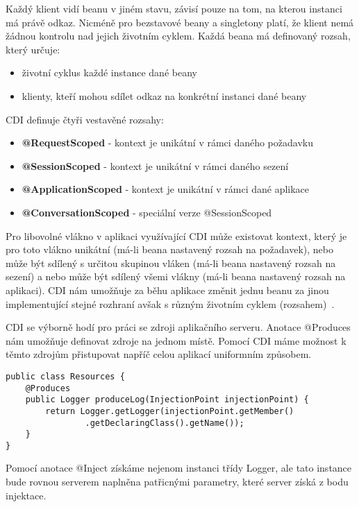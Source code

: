 \documentclass[122pt,oneside]{fithesis}
\begin{document}
Každý klient vidí beanu v jiném stavu, závisí pouze na tom, na kterou instanci má právě odkaz. Nicméně pro bezstavové beany a singletony platí, že klient nemá žádnou kontrolu nad jejich životním cyklem. Každá beana má definovaný rozsah, který určuje:

\begin{itemize}
  \item životní cyklus každé instance dané beany 
  \item klienty, kteří mohou sdílet odkaz na konkrétní instanci dané beany
\end{itemize}

CDI definuje čtyři vestavěné rozsahy:

\begin{itemize}
  \item{\bf @RequestScoped} - kontext je unikátní v rámci daného požadavku
  \item{\bf @SessionScoped} - kontext je unikátní v rámci daného sezení
  \item{\bf @ApplicationScoped} - kontext je unikátní v rámci dané aplikace
  \item{\bf @ConversationScoped} - speciální verze @SessionScoped
\end{itemize}

Pro libovolné vlákno v aplikaci využívající CDI může existovat kontext, který je pro toto vlákno unikátní (má-li beana nastavený rozsah na požadavek), nebo může být sdílený s určitou skupinou vláken (má-li beana nastavený rozsah na sezení) a nebo může být sdílený všemi vlákny (má-li beana nastavený rozsah na aplikaci). CDI nám umožňuje za běhu aplikace změnit jednu beanu za jinou implementující stejné rozhraní avšak s různým životním cyklem (rozsahem)~\cite{weld}.

CDI se výborně hodí pro práci se zdroji aplikačního serveru. Anotace @Produces nám umožňuje definovat zdroje na jednom místě. Pomocí CDI máme možnost k těmto zdrojům přistupovat napříč celou aplikací uniformním způsobem.

\begin{lstlisting}
public class Resources {
	@Produces
	public Logger produceLog(InjectionPoint injectionPoint) {
		return Logger.getLogger(injectionPoint.getMember()
				.getDeclaringClass().getName());
	}
}
\end{lstlisting}

Pomocí anotace @Inject získáme nejenom instanci třídy Logger, ale tato instance bude rovnou serverem naplněna patřicnými parametry, které server získá z bodu injektace.
\end{document}
